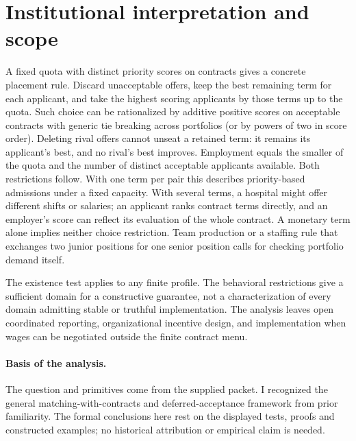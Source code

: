 \documentclass[11pt]{article}
\begin{document}
\section{Institutional interpretation and scope}
A fixed quota with distinct priority scores on contracts gives a concrete placement rule. Discard unacceptable offers, keep the best remaining term for each applicant, and take the highest scoring applicants by those terms up to the quota. Such choice can be rationalized by additive positive scores on acceptable contracts with generic tie breaking across portfolios (or by powers of two in score order). Deleting rival offers cannot unseat a retained term: it remains its applicant's best, and no rival's best improves. Employment equals the smaller of the quota and the number of distinct acceptable applicants available. Both restrictions follow. With one term per pair this describes priority-based admissions under a fixed capacity. With several terms, a hospital might offer different shifts or salaries; an applicant ranks contract terms directly, and an employer's score can reflect its evaluation of the whole contract. A monetary term alone implies neither choice restriction. Team production or a staffing rule that exchanges two junior positions for one senior position calls for checking portfolio demand itself.

The existence test applies to any finite profile. The behavioral restrictions give a sufficient domain for a constructive guarantee, not a characterization of every domain admitting stable or truthful implementation. The analysis leaves open coordinated reporting, organizational incentive design, and implementation when wages can be negotiated outside the finite contract menu.

\paragraph{Basis of the analysis.}
The question and primitives come from the supplied packet. I recognized the general matching-with-contracts and deferred-acceptance framework from prior familiarity. The formal conclusions here rest on the displayed tests, proofs and constructed examples; no historical attribution or empirical claim is needed.
\end{document}

